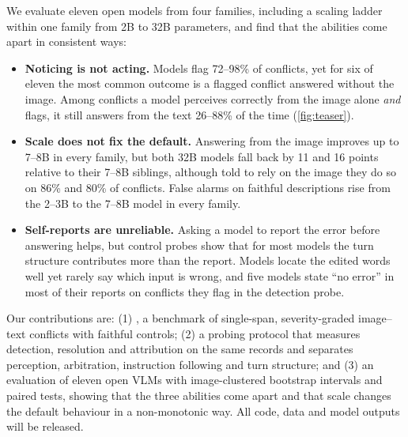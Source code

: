We evaluate eleven open models from four families, including a scaling ladder within one family from 2B to 32B parameters, and find that the abilities come apart in consistent ways:
\begin{itemize}[leftmargin=*,itemsep=1pt,topsep=2pt]
\item \textbf{Noticing is not acting.} Models flag 72--98\% of conflicts, yet for six of eleven the most common outcome is a flagged conflict answered without the image. Among conflicts a model perceives correctly from the image alone \emph{and} flags, it still answers from the text 26--88\% of the time (\cref{fig:teaser}).
\item \textbf{Scale does not fix the default.} Answering from the image improves up to 7--8B in every family, but both 32B models fall back by 11 and 16 points relative to their 7--8B siblings, although told to rely on the image they do so on 86\% and 80\% of conflicts. False alarms on faithful descriptions rise from the 2--3B to the 7--8B model in every family.
\item \textbf{Self-reports are unreliable.} Asking a model to report the error before answering helps, but control probes show that for most models the turn structure contributes more than the report. Models locate the edited words well yet rarely say which input is wrong, and five models state ``no error'' in most of their reports on conflicts they flag in the detection probe.
\end{itemize}

Our contributions are: (1) \name, a benchmark of single-span, severity-graded image--text conflicts with faithful controls; (2) a probing protocol that measures detection, resolution and attribution on the same records and separates perception, arbitration, instruction following and turn structure; and (3) an evaluation of eleven open VLMs with image-clustered bootstrap intervals and paired tests, showing that the three abilities come apart and that scale changes the default behaviour in a non-monotonic way. All code, data and model outputs will be released.
